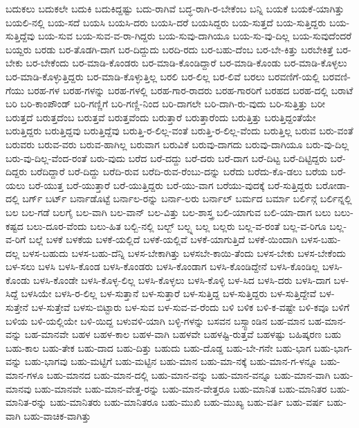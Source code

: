 {ಬದುಕಲು
ಬದುಕಲೇ
ಬದುಕಿ
ಬದುಕಿದ್ದಷ್ಟು
ಬದು-ರಾಗಿವೆ
ಬದ್ಧ-ರಾಗಿ-ರ-ಬೇಕೆಂಬ
ಬನ್ನಿ
ಬಯಕೆ
ಬಯಕೆ-ಯಾಗಿತ್ತು
ಬಯಲಿ-ನಲ್ಲಿ
ಬಯ-ಸದೆ
ಬಯಸಿ
ಬಯಸಿ-ದರು
ಬಯಸಿ-ದರೆ
ಬಯಸಿದ್ದರು
ಬಯ-ಸುತ್ತದೆ
ಬಯ-ಸುತ್ತಿದ್ದರು
ಬಯ-ಸುತ್ತಿದ್ದೆವು
ಬಯ-ಸುವ
ಬಯ-ಸುವ-ವ-ರಾ-ಗಿದ್ದರು
ಬಯ-ಸುವು-ದಾಗಿಯೂ
ಬಯ-ಸು-ವು-ದಿಲ್ಲ
ಬಯ-ಸುವುದೆಂದರೆ
ಬಯ್ದರು
ಬರಡು
ಬರ-ತೊಡಗಿ-ದಾಗ
ಬರ-ದಿದ್ದುದು
ಬರದಿ-ರದು
ಬರ-ಬಹು-ದೆಂಬ
ಬರ-ಬೇ-ಕಿತ್ತು
ಬರಬೇಕಿತ್ತೆ
ಬರ-ಬೇಕು
ಬರ-ಬೇಕೆಂದು
ಬರ-ಮಾಡಿ-ಕೊಂಡರು
ಬರ-ಮಾಡಿ-ಕೊಂಡಿದ್ದಾರೆ
ಬರ-ಮಾಡಿ-ಕೊಂಡು
ಬರ-ಮಾಡಿ-ಕೊಳ್ಳಲು
ಬರ-ಮಾಡಿ-ಕೊಳ್ಳುತ್ತಿದ್ದರು
ಬರ-ಮಾಡಿ-ಕೊಳ್ಳುತ್ತಿಲ್ಲ
ಬರಲಿ
ಬರ-ಲಿಲ್ಲ
ಬರ-ಲಿವೆ
ಬರಲು
ಬರವಣಿಗೆ-ಯಲ್ಲಿ
ಬರವಣಿ-ಗೆಯು
ಬರಹ-ಗಳ
ಬರಹ-ಗಳನ್ನು
ಬರಹ-ಗಳಲ್ಲಿ
ಬರಹ-ಗಾರ-ರಾದರು
ಬರಹ-ಗಾರರಿಗೆ
ಬರಹದ
ಬರಹ-ದಲ್ಲಿ
ಬರಾಟೆ
ಬರಿ
ಬರಿ-ಕಾಂಪೌಂಡ್
ಬರಿ-ಗಣ್ಣಿಗೆ
ಬರಿ-ಗಣ್ಣಿ-ನಿಂದ
ಬರಿ-ದಾಗಲೇ
ಬರಿ-ದಾಗಿ-ರು-ವುದು
ಬರಿ-ಸುತ್ತಿತ್ತು
ಬರೀ
ಬರುತ್ತದೆ
ಬರುತ್ತದೆಂಬ
ಬರುತ್ತವೆ
ಬರುತ್ತವೆಂದು
ಬರುತ್ತಾರೆ
ಬರುತ್ತಾರೆಂದು
ಬರುತ್ತಿತ್ತು
ಬರುತ್ತಿದ್ದಂತೆಯೇ
ಬರುತ್ತಿದ್ದರು
ಬರುತ್ತಿದ್ದವು
ಬರುತ್ತಿದ್ದೆವು
ಬರುತ್ತಿ-ರ-ಲಿಲ್ಲ-ವಂತೆ
ಬರುತ್ತಿ-ರ-ಲಿಲ್ಲ-ವೆಂದು
ಬರುತ್ತಿಲ್ಲ
ಬರುವ
ಬರು-ವಂತೆ
ಬರುವರು
ಬರುವ-ವರು
ಬರುವ-ಹಾಗಿಲ್ಲ
ಬರುವಾಗ
ಬರುವಿಕೆ
ಬರುವು-ದಾಗದು
ಬರುವು-ದಾಗಿಯೂ
ಬರು-ವು-ದಿಲ್ಲ
ಬರು-ವು-ದಿಲ್ಲ-ವೆಂದ-ರಂತೆ
ಬರು-ವುದು
ಬರೆದ
ಬರೆ-ದದ್ದು
ಬರೆ-ದರು
ಬರೆ-ದಾಗ
ಬರೆ-ದಿಟ್ಟ
ಬರೆ-ದಿಟ್ಟಿದ್ದರು
ಬರೆ-ದಿದ್ದರು
ಬರೆದಿದ್ದಾರೆ
ಬರೆ-ದಿದ್ದು
ಬರೆದಿ-ರುವ
ಬರೆದಿ-ರುವ-ರೆಂಬು-ದನ್ನು
ಬರೆದು
ಬರೆದು-ಕೊ-ಡಲು
ಬರೆಯ
ಬರೆ-ಯಲು
ಬರೆ-ಯುತ್ತ
ಬರೆ-ಯುತ್ತಾರೆ
ಬರೆ-ಯುತ್ತಿದ್ದರು
ಬರೆ-ಯು-ವಾಗ
ಬರೆಯು-ವುದಕ್ಕೆ
ಬರೆ-ಸುತ್ತಿದ್ದರು
ಬರೋಡಾ-ದಲ್ಲಿ
ಬರ್ಗ್
ಬರ್ಟ್
ಬರ್ನಾಡೊಟ್ಟೆ
ಬರ್ನಾಲ-ರನ್ನು
ಬರ್ನಾ-ಲರು
ಬರ್ನಾಲ್
ಬರ್ಮದ
ಬರ್ಮಾ
ಬರ್ಲಿನ್ಗೆ
ಬರ್ಲಿನ್ನಲ್ಲಿ
ಬಲ
ಬಲ-ಗಡೆ
ಬಲಗೈ
ಬಲ-ವಾಗಿ
ಬಲ-ವಾನ್
ಬಲ-ವಿತ್ತು
ಬಲ-ಶಾಸ್ತ್ರ
ಬಲಿ-ಯಾಗುವ
ಬಲಿ-ಯಾ-ದಾಗ
ಬಲು
ಬಲು-ಕಷ್ಟದ
ಬಲು-ದೂರ-ವೆಂದು
ಬಲು-ಹಿತ
ಬಲ್ಬಿ-ನಲ್ಲಿ
ಬಲ್ಬ್
ಬಲ್ಬ್ನ
ಬಲ್ಲ
ಬಲ್ಲರು
ಬಲ್ಲ-ವ-ರಂತೆ
ಬಲ್ಲ-ವ-ರಿಗೂ
ಬಲ್ಲ-ವ-ರಿಗೆ
ಬಲ್ಲೆ
ಬಳಕೆ
ಬಳಕೆಯ
ಬಳಕೆ-ಯಲ್ಲಿದೆ
ಬಳಕೆ-ಯಲ್ಲಿವೆ
ಬಳಕೆ-ಯಾಗುತ್ತಿದೆ
ಬಳಕೆ-ಯಿಂದಾಗಿ
ಬಳಸ-ಬಹು-ದಲ್ಲ
ಬಳಸ-ಬಹುದು
ಬಳಸ-ಬಹು-ದೆನ್ನಿ
ಬಳಸ-ಬೇಕಾಗಿತ್ತು
ಬಳಸಬೇ-ಕಾಯಿ-ತೆಂದು
ಬಳಸ-ಬೇಕು
ಬಳಸ-ಬೇಕೆಂದು
ಬಳ-ಸಲು
ಬಳಸಿ
ಬಳಸಿ-ಕೊಂಡ
ಬಳಸಿ-ಕೊಂಡರು
ಬಳಸಿ-ಕೊಂಡಾಗ
ಬಳಸಿ-ಕೊಂಡಿದ್ದೇನೆ
ಬಳಸಿ-ಕೊಂಡಿಲ್ಲ
ಬಳಸಿ-ಕೊಂಡು
ಬಳಸಿ-ಕೊಂಡೇ
ಬಳಸಿ-ಕೊಳ್ಳ-ಲಿಲ್ಲ
ಬಳಸಿ-ಕೊಳ್ಳಲು
ಬಳಸಿ-ಕೊಳ್ಳಿ
ಬಳ-ಸಿದ
ಬಳಸಿ-ದರು
ಬಳಸಿ-ದಾಗ
ಬಳ-ಸಿದ್ದೆ
ಬಳಸಿಯೇ
ಬಳಸಿ-ರ-ಲಿಲ್ಲ
ಬಳ-ಸುತ್ತಾನೆ
ಬಳ-ಸುತ್ತಾರೆ
ಬಳ-ಸುತ್ತಿದ್ದ
ಬಳ-ಸುತ್ತಿದ್ದರು
ಬಳ-ಸುತ್ತಿದ್ದೇವೆ
ಬಳ-ಸುತ್ತೇನೆ
ಬಳ-ಸುತ್ತೇವೆ
ಬಳಸು-ಬಿಟ್ಟಾರು
ಬಳ-ಸುವ
ಬಳ-ಸುವ-ವ-ರೆಂದು
ಬಳಿ
ಬಳಿಕ
ಬಳಿ-ಕ-ವಷ್ಟೇ
ಬಳಿ-ಕವೂ
ಬಳಿಗೆ
ಬಳಿಯ
ಬಳಿ-ಯಲ್ಲಿಯೇ
ಬಳಿ-ಯಿದ್ದ
ಬಳುವಳಿ-ಯಾಗಿ
ಬಳ್ಳಿ-ಗಳನ್ನು
ಬಸವನ
ಬಸ್ಸ್ಟಾಂಡಿನ
ಬಹ-ಮಾನ
ಬಹ-ಮಾನ-ವನ್ನು
ಬಹ-ಮಾನವೇ
ಬಹಳ
ಬಹಳ-ಕಾಲ
ಬಹಳ-ವಾಗಿ
ಬಹಳವೇ
ಬಹಳಷ್ಟಿ-ರುತ್ತವೆ
ಬಹಳಷ್ಟು
ಬಹಿಷ್ಕರಣ
ಬಹು
ಬಹು-ಕಾಲ
ಬಹು-ತೇಕ
ಬಹು-ದಾದ
ಬಹು-ದಿತ್ತು
ಬಹುದು
ಬಹು-ದೊಡ್ಡ
ಬಹು-ಬೇ-ಗನೇ
ಬಹು-ಭಾಗ
ಬಹು-ಭಾಗ-ವನ್ನು
ಬಹು-ಭಾಗವು
ಬಹು-ಮಟ್ಟಿಗೆ
ಬಹು-ಮಟ್ಟಿನ
ಬಹು-ಮಾನ
ಬಹು-ಮಾ-ನಕ್ಕೆ
ಬಹು-ಮಾನ-ಗ-ಳನ್ನೂ
ಬಹು-ಮಾನ-ಗಳೂ
ಬಹು-ಮಾನದ
ಬಹು-ಮಾನ-ದಲ್ಲಿ
ಬಹು-ಮಾನ-ವನ್ನು
ಬಹು-ಮಾನ-ವನ್ನೂ
ಬಹು-ಮಾನ-ವಾಗಿ
ಬಹು-ಮಾನವು
ಬಹು-ಮಾನವೇ
ಬಹು-ಮಾನ-ವೇತ್ತ-ರನ್ನು
ಬಹು-ಮಾನ-ವೇತ್ತರೂ
ಬಹು-ಮಾನಿತ
ಬಹು-ಮಾನಿತರ
ಬಹು-ಮಾನಿತ-ರನ್ನು
ಬಹು-ಮಾನಿತರು
ಬಹು-ಮಾನಿತರೂ
ಬಹು-ಮುಖಿ
ಬಹು-ಮುಖ್ಯ
ಬಹು-ವರ್ತಿ
ಬಹು-ವರ್ಷ
ಬಹು-ವಾಗಿ
ಬಹು-ವಾಚಿಕ-ವಾಗಿತ್ತು
}
